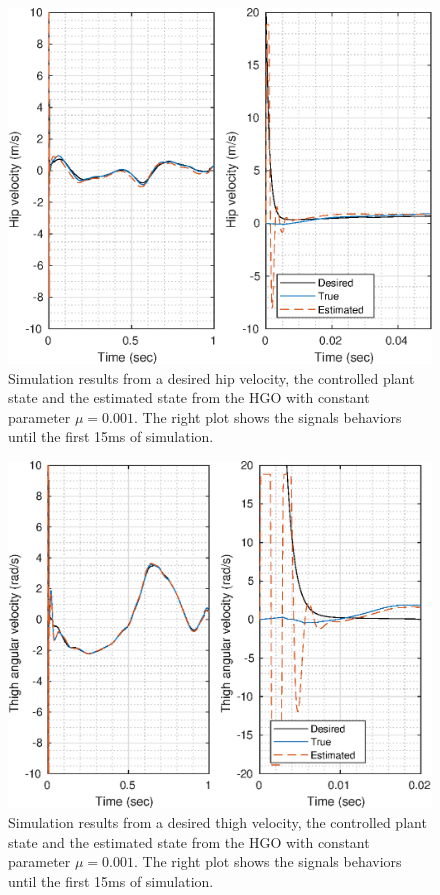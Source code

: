 \documentclass[letterpaper, 10 pt, journal, twocolumn]{IEEEtran}  %
\theoremstyle{plain}
\theoremstyle{definition}
\theoremstyle{remark}
\begin{document}
\begin{figure}[h!]
	\begin{center}
	\includegraphics[width = \columnwidth]{Figs/dq_hip_mu_1e-03.eps}
	\caption{ Simulation results from a desired hip velocity, the controlled plant state and the estimated state from the HGO with constant parameter $\mu=0.001$. The right plot shows the signals behaviors until the first 15ms of simulation.}
	\label{fig:dhip}
	\end{center}
\end{figure}
%
%
\begin{figure}[h!]
	\begin{center}
	\includegraphics[width = \columnwidth]{Figs/dq_thigh_mu_1e-03.eps}
	\caption{Simulation results from a desired thigh velocity, the controlled plant state and the estimated state from the HGO with constant parameter $\mu=0.001$. The right plot shows the signals behaviors until the first 15ms of simulation.}
	\label{fig:dthigh}
	\end{center}
\end{figure}
\end{document}
